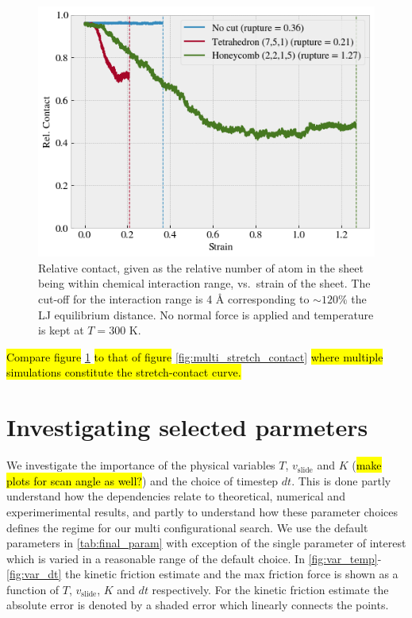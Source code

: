 \begin{figure}[H]
  \centering
  \includegraphics[width=0.6\linewidth]{figures/baseline/contact_vs_stretch.png}
  \caption{Relative contact, given as the relative number of atom in the sheet being within chemical interaction range, vs.\ strain of the sheet.  The cut-off for the interaction range is 4 Å corresponding to $\sim 120 \%$ the LJ equilibrium distance. No normal force is applied and temperature is kept at $T = 300$ K.}
  \label{fig:contact_vs_stretch}
\end{figure}

\hl{Compare figure} \cref{fig:contact_vs_stretch} \hl{to that of figure} \cref{fig:multi_stretch_contact} \hl{where multiple simulations constitute the stretch-contact curve.}


\section{Investigating selected parmeters}

We investigate the importance of the physical variables $T$, $v_{\text{slide}}$ and $K$ (\hl{make plots for scan angle as well?}) and the choice of timestep $dt$. This is done partly understand how the dependencies relate to theoretical, numerical and experimerimental results, and partly to understand how these parameter choices defines the regime for our multi configurational search. We use the default parameters in \cref{tab:final_param} with exception of the single parameter of interest which is varied in a reasonable range of the default choice. In \cref{fig:var_temp}-\cref{fig:var_dt} the kinetic friction estimate and the max friction force is shown as a function of $T$, $v_{\text{slide}}$, $K$ and $dt$ respectively. For the kinetic friction estimate the absolute error is denoted by a shaded error which linearly connects the points.


